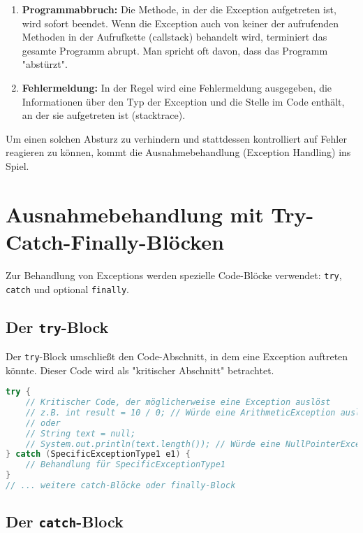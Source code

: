 \begin{enumerate}
    \item \textbf{Programmabbruch:} Die Methode, in der die Exception aufgetreten ist, wird sofort beendet. Wenn die Exception auch von keiner der aufrufenden Methoden in der Aufrufkette (\gls{callstack}) behandelt wird, terminiert das gesamte Programm abrupt. Man spricht oft davon, dass das Programm "abstürzt".
    \item \textbf{Fehlermeldung:} In der Regel wird eine Fehlermeldung ausgegeben, die Informationen über den Typ der Exception und die Stelle im Code enthält, an der sie aufgetreten ist (\gls{stacktrace}).
\end{enumerate}

Um einen solchen Absturz zu verhindern und stattdessen kontrolliert auf Fehler
reagieren zu können, kommt die Ausnahmebehandlung (Exception Handling) ins
Spiel.

\section{Ausnahmebehandlung mit Try-Catch-Finally-Blöcken}

Zur Behandlung von Exceptions werden spezielle Code-Blöcke verwendet:
\texttt{try}, \texttt{catch} und optional \texttt{finally}.

\subsection{Der \texttt{try}-Block}

Der \texttt{try}-Block umschließt den Code-Abschnitt, in dem eine Exception
auftreten könnte. Dieser Code wird als "kritischer Abschnitt" betrachtet.

\begin{lstlisting}[language=Java, caption={Beispiel für einen try-Block}, label=lst:tryblock_beispiel]
try {
    // Kritischer Code, der möglicherweise eine Exception auslöst
    // z.B. int result = 10 / 0; // Würde eine ArithmeticException auslösen
    // oder
    // String text = null;
    // System.out.println(text.length()); // Würde eine NullPointerException auslösen
} catch (SpecificExceptionType1 e1) {
    // Behandlung für SpecificExceptionType1
}
// ... weitere catch-Blöcke oder finally-Block
\end{lstlisting}

\subsection{Der \texttt{catch}-Block}

